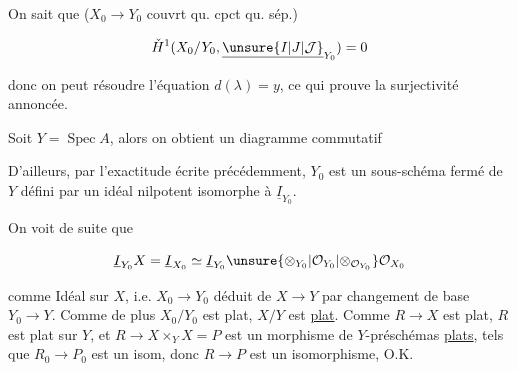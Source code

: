
On sait que ($X_0\longrightarrow Y_0$  couvrt qu. cpct qu. sép.)

\[
\check H^1(X_0/Y_0,\underline{\unsure{I|J|\mathcal J}}_{Y_0})=0
\]

donc on peut résoudre l'équation $d(\lambda)=y$, ce qui prouve la surjectivité annoncée.

 Soit $Y=\operatorname{Spec} A$, alors  on obtient un diagramme commutatif


D'ailleurs,  par l'exactitude écrite précédemment, $Y_0$ est un sous-schéma fermé de $Y$ défini par un idéal nilpotent isomorphe à $\underline I_{Y_0}$.

On voit de suite que

\[
\underline I_{Y_0}X=\underline I_{X_0}\simeq\underline I_{Y_0}\unsure{\otimes_{Y_0}|\mathcal O_{Y_0}|\otimes_{\mathcal O_{Y_0}}}\mathcal O_{X_0}
\]

comme Idéal sur $X$, i.e. $X_0\longrightarrow Y_0$ déduit de $X\longrightarrow Y$ par changement de base $Y_0\longrightarrow Y$. Comme de plus $X_0/Y_0$ est plat, $X/Y$ est \uline{plat}. Comme $R\longrightarrow X$ est plat, $R$ est plat sur $Y$, et $R\longrightarrow X\times_Y X=P$ est un morphisme de $Y$-préschémas \uline{plats}, tels que $R_0\longrightarrow P_0$ est un isom, donc $R\longrightarrow P$ est un isomorphisme, O.K.
